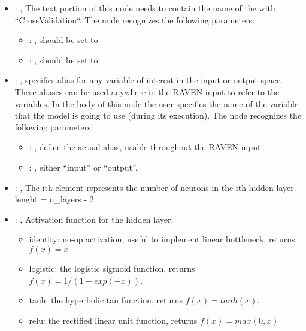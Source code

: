 \begin{itemize}
    \item {}: , 
      The text portion of this node needs to contain the name of the  with
               ``CrossValidation``.
      The  node recognizes the following parameters:
        \begin{itemize}
          \item {}: , 
            should be set to 
          \item {}: , 
            should be set to 
      \end{itemize}

    \item {}: , 
      specifies alias for         any variable of interest in the input or output space. These
      aliases can be used anywhere in the RAVEN input to         refer to the variables. In the body
      of this node the user specifies the name of the variable that the model is going to use
      (during its execution).
      The  node recognizes the following parameters:
        \begin{itemize}
          \item {}: , 
            define the actual alias, usable throughout the RAVEN input
          \item {}: , 
            either ``input'' or ``output''.
      \end{itemize}

    \item {}: , 
      The ith element represents the number of neurons in the ith hidden layer.
      lenght = n\_layers - 2

    \item {}: , 
      Activation function for the hidden layer:
      \begin{itemize}                                                    \item identity:  no-op
      activation, useful to implement linear bottleneck, returns $f(x) = x$
      \item logistic: the logistic sigmoid function, returns $f(x) = 1 / (1 + exp(-x))$.
      \item tanh: the hyperbolic tan function, returns $f(x) = tanh(x)$.
      \item relu:  the rectified linear unit function, returns $f(x) = max(0, x)$
      \end{itemize}


\end{itemize}
